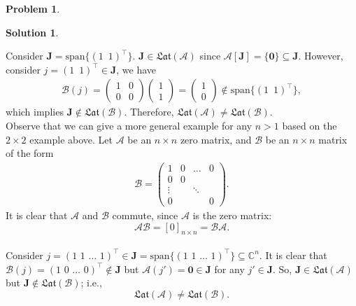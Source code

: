 \documentclass{book}
\theoremstyle{definition}
\newtheorem*{prob*}{Problem}
\newtheorem*{sln*}{Solution}
\newcommand{\xpan}{\text{span}}
\newcommand{\J}{\mathbf{J}}
\begin{document}
\begin{prob*}
\begin{sln*}
\begin{enumerate}
			Consider $\J = \xpan\{(1\,\,\,1)^\top\}$. $\J \in \mathfrak{Lat}(\mathcal{A})$ since $\mathcal{A}[\J] = \{ \mathbf{0}\} \subseteq \J$. However, consider $j = (1\,\,\,1)^\top \in \J$, we have
			\begin{align*}
			\mathcal{B}(j) = \begin{pmatrix}
			1&0\\
			0&0
			\end{pmatrix}\begin{pmatrix}
			1\\1
			\end{pmatrix}=
			\begin{pmatrix}
			1\\0
			\end{pmatrix} \notin \xpan\{ (1\,\,\, 1)^\top \},
			\end{align*} 
			which implies $\J \notin \mathfrak{Lat}(\mathcal{B})$. Therefore, $\mathfrak{Lat}(\mathcal{A}) \neq \mathfrak{Lat}(\mathcal{B})$.\\
			
			Observe that we can give a more general example for any $n>1$ based on the $2\times 2$ example above. Let $\mathcal{A}$ be an $n\times n$ zero matrix, and $\mathcal{B}$ be an $n\times n$ matrix of the form
			\begin{align*}
			\mathcal{B} = \begin{pmatrix}
			1&0&\dots&0\\
			0&0\\
			\vdots&&\ddots\\
			0&&&0
			\end{pmatrix}.
			\end{align*}
			It is clear that $\mathcal{A}$ and $\mathcal{B}$ commute, since $\mathcal{A}$ is the zero matrix: $$\mathcal{AB} = [0]_{n\times n} = \mathcal{BA}.$$\\
		
			Consider $j = (1\,\,1\,\,\dots\,\,1)^\top \in \J = \xpan\{ (1\,\,1\,\,\dots\,\,1)^\top \} \subseteq \mathbb{C}^n$. It is clear that $\mathcal{B}(j) = (1\,\,0\,\,\dots\,\,0)^\top \notin \J$ but $\mathcal{A}(j') = \mathbf{0} \in \J$ for any $j'\in\J$. So, $\J \in \mathfrak{Lat}(\mathcal{A})$ but $\J \notin \mathfrak{Lat}(\mathcal{B})$; i.e., $$\mathfrak{Lat}(\mathcal{A}) \neq \mathfrak{Lat}(\mathcal{B}).$$ 
		\end{enumerate}
	\end{sln*}
\end{prob*}
\end{document}
